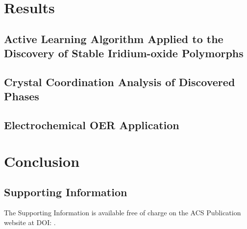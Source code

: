 \section{Results}


  \subsection{Active Learning Algorithm Applied to the Discovery of Stable Iridium-oxide Polymorphs}
  

  \subsection{Crystal Coordination Analysis of Discovered Phases}
  

  \subsection{Electrochemical OER Application}
  


\section{Conclusion}


\subsection{Supporting Information}
The Supporting Information is available free of charge on the ACS Publication website at DOI: .

